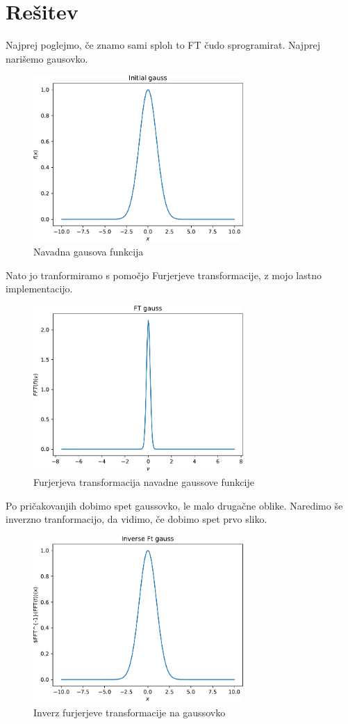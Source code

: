 \section{Rešitev}
Najprej poglejmo, če znamo sami sploh to FT čudo sprogramirat. Najprej
narišemo gausovko.
\begin{figure}[h]
    \centering
    \includegraphics[width=8cm]{pdfs/gauss.pdf}
    \caption{Navadna gausova funkcija}
\end{figure}
Nato jo tranformiramo s pomočjo Furjerjeve transformacije, z mojo lastno implementacijo.
\begin{figure}[h]
    \centering
    \includegraphics[width=8cm]{pdfs/fft(gauss).pdf}
    \caption{Furjerjeva transformacija navadne gaussove funkcije}
\end{figure}
Po pričakovanjih dobimo spet gaussovko, le malo drugačne oblike. Naredimo še inverzno tranformacijo, da vidimo,
če dobimo spet prvo sliko.
\newpage
\begin{figure}[h]
    \centering
    \includegraphics[width=8cm]{pdfs/inf(fft).pdf}
    \caption{Inverz furjerjeve transformacije na gaussovko}
\end{figure}
